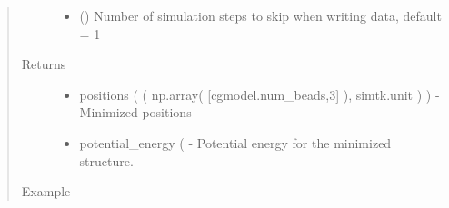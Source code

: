 \documentclass[letterpaper,12pt,english,openany,oneside]{sphinxmanual}
\begin{document}
\begin{fulllineitems}
\begin{quote}
\begin{description}
\begin{itemize}
\item {} 
 () \textendash{} Number of simulation steps to skip when writing data, default = 1

\end{itemize}

\item[{Returns}] \leavevmode
\begin{itemize}
\item {} 
positions (  ( np.array( {[}cgmodel.num\_beads,3{]} ), simtk.unit ) ) - Minimized positions

\item {} 
potential\_energy (  - Potential energy for the minimized structure.

\end{itemize}


\item[{Example}] \leavevmode
\end{description}\end{quote}


\end{fulllineitems}
\end{document}
